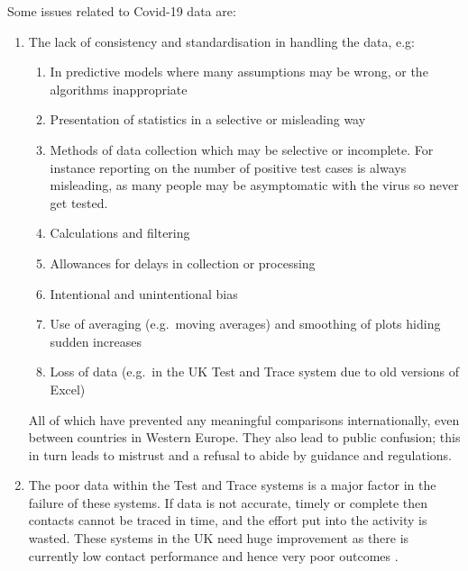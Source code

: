 Some issues related to Covid-19 data are:
\begin{enumerate}
\item The lack of \gls{consistency} and standardisation in handling the data, e.g:
  \begin{enumerate}[label=\color{dsiwgAccentColour}{\alph*.}]
  \item In predictive models where many assumptions may be wrong, or the algorithms inappropriate
  \item Presentation of statistics in a selective or misleading way
  \item Methods of data collection which may be selective or incomplete. For instance reporting on the number of positive test cases is always misleading, as many people may be asymptomatic with the virus so never get tested.
  \item Calculations and filtering
  \item Allowances for delays in collection or processing
  \item Intentional and unintentional bias
  \item Use of averaging (e.g.\ moving averages) and smoothing of plots hiding sudden increases
  \item Loss of data (e.g.\ in the UK Test and Trace system due to old versions of Excel)
  \end{enumerate}
All of which have prevented any meaningful comparisons internationally, even between countries in Western Europe. They also lead to public confusion; this in turn leads to mistrust and a refusal to abide by guidance and regulations. 

\item The poor data within the Test and Trace systems is a major factor in the failure of these systems. If data is not accurate, timely or complete then contacts cannot be traced in time, and the effort put into the activity is wasted. These systems in the UK need huge improvement as there is currently low contact performance and hence very poor outcomes \cite{citation:testandtrace}.
\end{enumerate}


